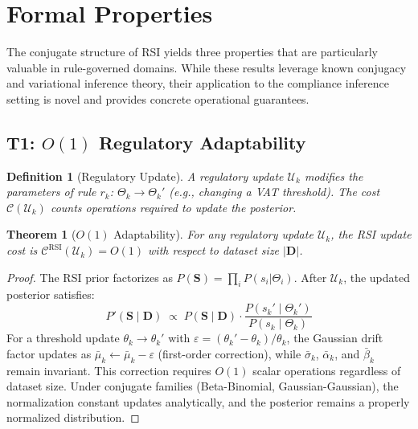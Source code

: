 \documentclass[letterpaper]{article}
\newtheorem{theorem}{Theorem}
\newtheorem{definition}{Definition}
\begin{document}
\section{Formal Properties}
\label{sec:theory}

The conjugate structure of RSI yields three properties that are
particularly valuable in rule-governed domains. While these results
leverage known conjugacy and variational inference theory, their
application to the compliance inference setting is novel and provides
concrete operational guarantees.

\subsection{T1: $O(1)$ Regulatory Adaptability}

\begin{definition}[Regulatory Update]
A regulatory update $\mathcal{U}_k$ modifies the parameters of rule
$r_k$: $\Theta_k \to \Theta_k'$ (e.g., changing a VAT threshold).
The cost $\mathcal{C}(\mathcal{U}_k)$ counts operations required to
update the posterior.
\end{definition}

\begin{theorem}[$O(1)$ Adaptability]
\label{thm:o1}
For any regulatory update $\mathcal{U}_k$, the RSI update cost is
$\mathcal{C}^{\mathrm{RSI}}(\mathcal{U}_k) = O(1)$ with respect to
dataset size $|\mathbf{D}|$.
\end{theorem}

\begin{proof}
The RSI prior factorizes as $P(\mathbf{S}) = \prod_i P(s_i | \Theta_i)$.
After $\mathcal{U}_k$, the updated posterior satisfies:
\[
  P'(\mathbf{S} \mid \mathbf{D}) \;\propto\; P(\mathbf{S} \mid \mathbf{D})
  \cdot \frac{P(s_k' \mid \Theta_k')}{P(s_k \mid \Theta_k)}
\]
For a threshold update $\theta_k \to \theta_k'$ with
$\varepsilon = (\theta_k' - \theta_k)/\theta_k$, the Gaussian drift
factor updates as $\bar{\mu}_k \leftarrow \bar{\mu}_k - \varepsilon$
(first-order correction), while $\bar{\sigma}_k$, $\bar{\alpha}_k$,
and $\bar{\beta}_k$ remain invariant. This correction requires $O(1)$
scalar operations regardless of dataset size. Under conjugate families
(Beta-Binomial, Gaussian-Gaussian), the normalization constant updates
analytically, and the posterior remains a properly normalized
distribution.
\end{proof}
\end{document}
